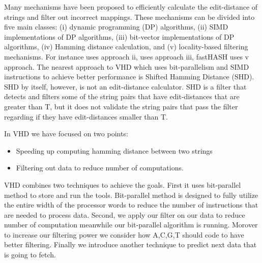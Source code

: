Many mechanisms have been proposed to efficiently calculate the edit-distance of strings and filter out incorrect mappings. These mechanisms can be divided into five main classes: (i) dynamic programming (DP) algorithms, (ii) SIMD implementations of DP algorithms, (iii) bit-vector implementations of DP algorithms, (iv) Hamming distance calculation, and (v) locality-based filtering mechanisms. For instance \cite{swps3} uses approach ii, \cite{seqan} uses approach iii, fastHASH\cite{fasthash} uses v approach. The nearest approach to VHD which uses bit-parallelism and SIMD instructions to achieve better performance is Shifted Hamming Distance (SHD)\cite{shd}. SHD by itself, however, is not an edit-distance calculator. SHD is a filter that detects and filters some of the string pairs that have edit-distances that are greater than T, but it does not validate the string pairs that pass the filter regarding if they have edit-distances smaller than T.
  
In VHD we have focused on two points:
\begin{itemize}
\item Speeding up computing hamming distance between two strings
\item Filtering out data to reduce number of computations.
\end{itemize}
  
 VHD combines two techniques to achieve the goals. First it uses bit-parallel method to store and run the tools. Bit-parallel method is designed to fully utilize the entire width of the processor words to reduce the number of instructions that are needed to process data. Second, we apply  our filter on our data to reduce number of computation meanwhile our bit-parallel algorithm is running. Morover to increase our filtering power we consider how A,C,G,T should code to have better filtering. Finally we introduce another technique to predict next data that is going to fetch.
 
